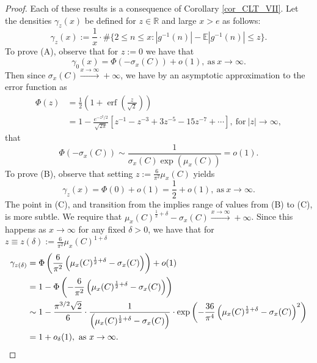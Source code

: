 \documentclass[11pt,reqno,a4letter]{article}
\numberwithin{figure}{section}
\numberwithin{table}{section}
\theoremstyle{plain}
\numberwithin{theorem}{section}
\theoremstyle{definition}
\begin{document}
\begin{proof} 
Each of these results is a consequence of Corollary \ref{cor_CLT_VII}. 
Let the densities $\gamma_z(x)$ be defined for $z \in \mathbb{R}$ and 
large $x > e$ as follows: 
\[
\gamma_z(x) := \frac{1}{x} \cdot \#\{2 \leq n \leq x: |g^{-1}(n)| - \mathbb{E}|g^{-1}(n)| \leq z\}. 
\]
To prove (A), observe that for $z := 0$ we have that 
\[
\gamma_0(x) = \Phi\left(-\sigma_x(C)\right) + o(1), \mathrm{\ as\ } x \rightarrow \infty. 
\]
Then since $\sigma_x(C) \xrightarrow{x \rightarrow \infty} +\infty$, we have by an asymptotic approximation 
to the error function as 
\begin{align*} 
\Phi(z) & = \frac{1}{2}\left(1 + \operatorname{erf}\left(\frac{z}{\sqrt{2}}\right)\right) \\ 
     & = 1 - \frac{e^{-z^2/2}}{\sqrt{2\pi}}\left[ 
     z^{-1} - z^{-3} + 3z^{-5} - 15z^{-7} + \cdots 
     \right], \mathrm{\ for\ } |z| \rightarrow \infty, 
\end{align*} 
that 
\[
\Phi\left(-\sigma_x(C)\right) \sim \frac{1}{\sigma_x(C) \exp(\mu_x(C))} = o(1). 
\]
To prove (B), observe that setting $z := \frac{6}{\pi^2} \mu_x(C)$ yields 
\[
\gamma_z(x) = \Phi(0) + o(1) = \frac{1}{2} + o(1), \mathrm{\ as\ } x \rightarrow \infty. 
\]
The point in (C), and transition from the implies range of values from (B) to (C), is more subtle. 
We require that $\mu_x(C)^{\frac{1}{2} + \delta} - \sigma_x(C) \xrightarrow{x \rightarrow \infty} +\infty$. 
Since this happens as $x \rightarrow \infty$ for any fixed $\delta > 0$, we have that 
for $z \equiv z(\delta) := \frac{6}{\pi^2} \mu_x(C)^{1 + \delta}$ 
\begin{align*} 
\gamma_{z(\delta)} & = \Phi\left(\frac{6}{\pi^2}\left(\mu_x(C)^{\frac{1}{2} + \delta} - \sigma_x(C)\right)\right) + o(1) \\ 
     & = 1 - \Phi\left(-\frac{6}{\pi^2}\left(\mu_x(C)^{\frac{1}{2} + \delta} - \sigma_x(C)\right)\right) \\ 
     & \sim 1 - \frac{\pi^{3/2} \sqrt{2}}{6} \cdot \frac{1}{\left(\mu_x(C)^{\frac{1}{2} + \delta} - \sigma_x(C)\right)} \cdot 
     \exp\left(-\frac{36}{\pi^4} \left(\mu_x(C)^{\frac{1}{2} + \delta} - \sigma_x(C)\right)^2\right) \\ 
     & = 1 + o_{\delta}(1), \mathrm{\ as\ } x \rightarrow \infty. 
     \qedhere 
\end{align*} 
\end{proof} 
\end{document}
